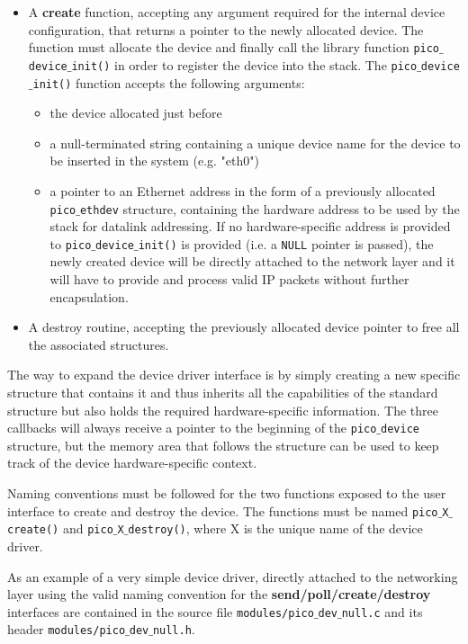 \begin{itemize}
\item A \textbf{create} function, accepting any argument required for the internal device configuration,
that returns a pointer to the newly allocated device. The function must allocate the device and
finally call the library function \texttt{pico$\_$device$\_$init()} in order to register the
device into the stack.
The \texttt{pico$\_$device$\_$init()} function accepts the following arguments:

\begin{itemize}
\item the device allocated just before
\item a null-terminated string containing a unique device name for the device to be inserted in
the system (e.g. "eth0")
\item a pointer to an Ethernet address in the form of a previously allocated \texttt{pico$\_$ethdev}
structure, containing the hardware address to be used by the stack for datalink addressing.
If no hardware-specific address is provided to \texttt{pico$\_$device$\_$init()} is provided
(i.e. a \texttt{NULL} pointer is passed), the newly created device will be directly attached
to the network layer and it will have to provide and process valid IP packets without further
encapsulation.
\end{itemize}

\item A destroy routine, accepting the previously allocated device pointer to free all the associated structures.

\end{itemize}

The way to expand the device driver interface is by simply creating a new specific structure
that contains it and thus inherits all the capabilities of the standard structure but also holds
the required hardware-specific information. The three callbacks will always receive a pointer
to the beginning of the \texttt{pico$\_$device} structure, but the memory area that follows
the structure can be used to keep track of the device hardware-specific context.

Naming conventions must be followed for the two functions exposed to the user interface to
create and destroy the device. The functions must be named \texttt{pico$\_$X$\_$create()} and
\texttt{pico$\_$X$\_$destroy()}, where X is the unique name of the device driver.

As an example of a very simple device driver, directly attached to the networking layer using
the valid naming convention for the \textbf{send/poll/create/destroy} interfaces are contained in the source
file \texttt{modules/pico$\_$dev$\_$null.c} and its header \texttt{modules/pico$\_$dev$\_$null.h}.
